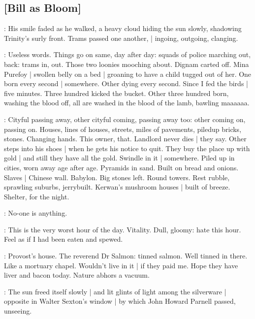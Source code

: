 \subsection{[Bill as Bloom]}

:
His smile faded as he walked,
a heavy cloud hiding the sun slowly,
shadowing Trinity's surly front.
Trams passed one another, |
ingoing,
outgoing,
clanging.

\BloomInt:
Useless words.
Things go on same,
day after day:
squads of police marching out,
back:
trams in,
out.
Those two loonies mooching about.
Dignam carted off.
Mina Purefoy |
swollen belly on a bed |
groaning to have a child tugged out of her.
One born every second |
somewhere.
Other dying every second.
Since I fed the birds |
five minutes.
Three hundred kicked the bucket.
Other three hundred born,
washing the blood off,
all are washed in the blood of the lamb,
bawling maaaaaa.

\BloomInt:
Cityful passing away,
other cityful coming,
passing away too:
other coming on,
passing on.
Houses, lines of houses,
streets,
miles of pavements,
piledup bricks,
stones.
Changing hands.
This owner,
that.
Landlord never dies |
they say.
Other steps into his shoes |
when he gets his notice to quit.
They buy the place up with gold |
and still they have all the gold.
Swindle in it |
somewhere.
Piled up in cities,
worn away age after age.
Pyramids in sand.
Built on bread and onions.
Slaves |
Chinese wall.
Babylon.
Big stones left.
Round towers.
Rest rubble,
sprawling suburbs,
jerrybuilt.
Kerwan's mushroom houses |
built of breeze.
Shelter,
for the night.

\BloomInt:
No-one is anything.

\BloomInt:
This is the very worst hour of the day.
Vitality.
Dull, gloomy:
hate this hour.
Feel as if I had been eaten and spewed.

\BloomInt:
Provost's house.
The reverend Dr Salmon:
tinned salmon.
Well tinned in there.
Like a mortuary chapel.
Wouldn't live in it |
if they paid me.
Hope they have liver and bacon today.
Nature abhors a vacuum.

:
The sun freed itself slowly |
and lit glints of light among the silverware |
opposite in Walter Sexton's window |
by which John Howard Parnell passed,
unseeing.

